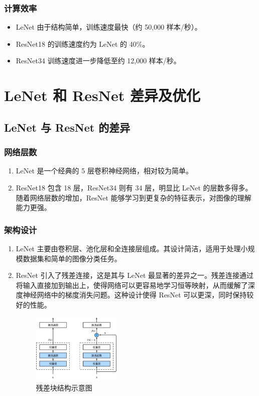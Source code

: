 \documentclass[UTF8]{ctexart}
\begin{document}
\subsubsection{计算效率}
\begin{itemize}
    \item LeNet 由于结构简单，训练速度最快（约 50,000 样本/秒）。
    \item ResNet18 的训练速度约为 LeNet 的 40\%。
    \item ResNet34 训练速度进一步降低至约 12,000 样本/秒。
\end{itemize}

\section{LeNet 和 ResNet 差异及优化}
\subsection{LeNet 与 ResNet 的差异}
\subsubsection{网络层数}
\begin{enumerate}
    \item LeNet 是一个经典的 5 层卷积神经网络，相对较为简单。
    \item ResNet18 包含 18 层，ResNet34 则有 34 层，明显比 LeNet 的层数多得多。随着网络层数的增加，ResNet 能够学习到更复杂的特征表示，对图像的理解能力更强。
\end{enumerate}

\subsubsection{架构设计}
\begin{enumerate}
    \item LeNet 主要由卷积层、池化层和全连接层组成。其设计简洁，适用于处理小规模数据集和简单的图像分类任务。
    \item ResNet 引入了残差连接，这是其与 LeNet 最显著的差异之一。残差连接通过将输入直接加到输出上，使得网络可以更容易地学习恒等映射，从而缓解了深度神经网络中的梯度消失问题。这种设计使得 ResNet 可以更深，同时保持较好的性能。
    \begin{figure}[H]
        \centering
        \includegraphics[width=0.4\textwidth]{picture/residual-block.png}
        \caption{残差块结构示意图}
    \end{figure}
\end{enumerate}
\end{document}
